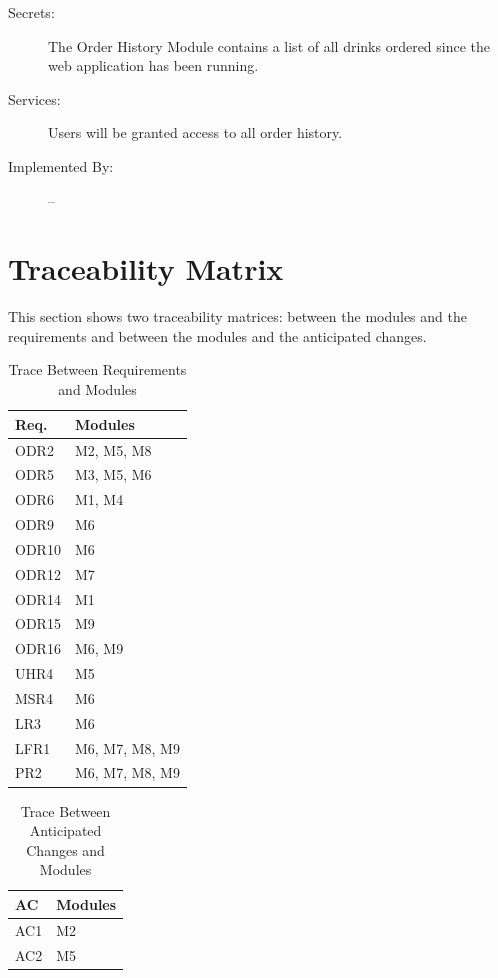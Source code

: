 \documentclass[12pt, titlepage]{article}
\begin{document}
\begin{description}
\item[Secrets:] The Order History Module contains a list of all drinks ordered since the web application has been running.
\item[Services:] Users will be granted access to all order history.
\item[Implemented By:] --
\end{description}


\section{Traceability Matrix} \label{SecTM}

This section shows two traceability matrices: between the modules and the
requirements and between the modules and the anticipated changes.

\begin{table}[H]
\centering
\begin{tabular}{p{} p{}}
\toprule
\textbf{Req.} & \textbf{Modules}\\
\midrule
ODR2 & M2, M5, M8\\
ODR5 & M3, M5, M6\\
ODR6 & M1, M4 \\
ODR9 & M6 \\
ODR10 & M6\\
ODR12 & M7\\
ODR14 & M1 \\
ODR15 & M9\\
ODR16 & M6, M9\\
UHR4 & M5\\
MSR4 & M6\\
LR3 & M6\\
LFR1 & M6, M7, M8, M9\\
PR2 & M6, M7, M8, M9\\
\bottomrule
\end{tabular}
\caption{Trace Between Requirements and Modules}
\label{TblRT}
\end{table}

\begin{table}[H]
\centering
\begin{tabular}{p{} p{}}
\toprule
\textbf{AC} & \textbf{Modules}\\
\midrule
AC1 & M2 \\
AC2 & M5 \\
\bottomrule
\end{tabular}
\caption{Trace Between Anticipated Changes and Modules}
\label{TblACT}
\end{table}
\end{document}
